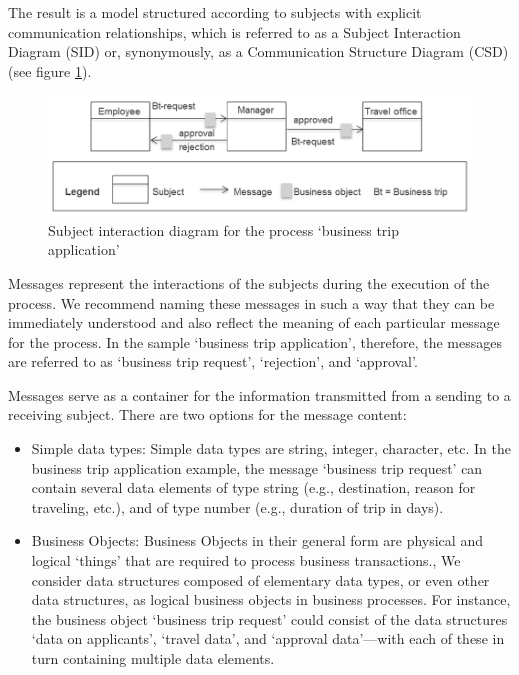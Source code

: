 The result is a model structured according to subjects with explicit communication relationships, which is referred to as a Subject Interaction Diagram (SID) or, synonymously, as a Communication Structure Diagram (CSD) (see figure \ref{fig:beispiel-subject-interaction}).

\begin{figure}[ph]
	\centering
	\includegraphics[width=14cm]{20181026-Ontologie-Bilder/Grafiken-Ontologie/SUbject-Interaction/Beispiel-Subject-Interaction}
	\caption[Subject interaction diagram]{Subject interaction diagram for the process ‘business trip application’}
	\label{fig:beispiel-subject-interaction}
\end{figure}


Messages represent the interactions of the subjects during the execution of the process. We recommend naming these messages in such a way that they can be immediately understood and also reflect the meaning of each particular message for the process. In the sample ‘business trip application’, therefore, the messages are referred to as ‘business trip request’, ‘rejection’, and ‘approval’.

Messages serve as a container for the information transmitted from a sending to a receiving subject. There are two options for the message content:

\begin{itemize}
	\item 	Simple data types: Simple data types are string, integer, character, etc. In the business trip application example, the message ‘business trip request’ can contain several data elements of type string (e.g., destination, reason for traveling, etc.), and of type number (e.g., duration of trip in days).
	\item Business Objects: Business Objects in their general form are physical and logical ‘things’ that are required to process business transactions., We consider data structures composed of elementary data types, or even other data structures, as logical business objects in business processes. For instance, the business object ‘business trip request’ could consist of the data structures ‘data on applicants’, ‘travel data’, and ‘approval data’—with each of these in turn containing multiple data elements.
\end{itemize}


